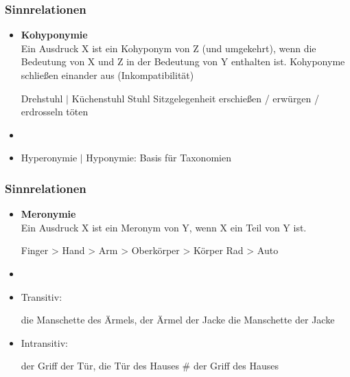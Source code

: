 
\begin{frame}
\frametitle{Sinnrelationen}

\begin{itemize}
	\item \textbf{Kohyponymie}\\
Ein Ausdruck X ist ein Kohyponym von Z (und umgekehrt), wenn die Bedeutung von X und Z in der Bedeutung von Y enthalten ist. Kohyponyme schließen einander aus (Inkompatibilität)

\eal
\ex Drehstuhl $|$ Küchenstuhl \ras Stuhl \ras Sitzgelegenheit
\ex erschießen / erwürgen / erdrosseln \ras töten
\zl


	\item[]
	\item Hyperonymie $|$ Hyponymie: Basis für Taxonomien

\end{itemize}

\end{frame}



\begin{frame}
\frametitle{Sinnrelationen}

\begin{itemize}
	\item \textbf{Meronymie}\\
Ein Ausdruck X ist ein Meronym von Y, wenn X ein Teil von Y ist.

\vspace{5mm}
	
	\eal
	\ex Finger > Hand > Arm > Oberkörper > Körper
	\ex Rad > Auto
	\zl
	
	\item[]
	\item Transitiv: 
		
	\ea die Manschette des Ärmels, der Ärmel der Jacke \ras die Manschette der Jacke
	\z
		
	\item Intransitiv: 
		
	\ea der Griff der Tür, die Tür des Hauses \ras \# der Griff des Hauses
	\z
		
\end{itemize}

\end{frame}




